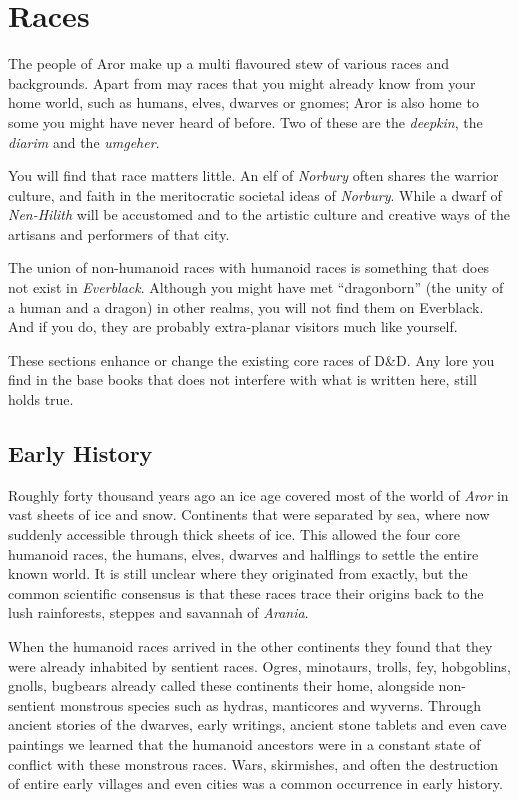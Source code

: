 \twocolumn
\section*{Races}

The people of Aror make up a multi flavoured stew of various races and
backgrounds. Apart from may races that you might already know from your
home world, such as humans, elves, dwarves or gnomes; Aror is also home to some
you might have never heard of before. Two of these are the \emph{deepkin}, the
\emph{diarim} and the \emph{umgeher}.

You will find that race matters little. An elf of \emph{Norbury} often shares
the warrior culture, and faith in the meritocratic societal ideas
of \emph{Norbury}. While a dwarf of \emph{Nen-Hilith} will be accustomed and
to the artistic culture and creative ways of the artisans and performers of
that city.

The union of non-humanoid races with humanoid races is something that does
not exist in \emph{Everblack}. Although you might have met ``dragonborn''
(the unity of a human and a dragon) in other realms, you will not find them
on Everblack. And if you do, they are probably extra-planar visitors much
like yourself.

\begin{note}
These sections enhance or change the existing core races of D\&D. Any lore you
find in the base books that does not interfere with what is written here, still
holds true.
\end{note}

\subsection*{Early History}

Roughly forty thousand years ago an ice age covered most of the world
of \emph{Aror} in vast sheets of ice and snow. Continents that were separated
by sea, where now suddenly accessible through thick sheets of ice. This
allowed the four core humanoid races, the humans, elves, dwarves and halflings
to settle the entire known world. It is still unclear where they originated
from exactly, but the common scientific consensus is that these races trace
their origins back to the lush rainforests, steppes and savannah
of \emph{Arania}.

When the humanoid races arrived in the other continents they found that they
were already inhabited by sentient races. Ogres, minotaurs, trolls, fey,
hobgoblins, gnolls, bugbears already called these continents their home,
alongside non-sentient monstrous species such as hydras, manticores and
wyverns. Through ancient stories of the dwarves, early writings, ancient stone
tablets and even cave paintings we learned that the humanoid ancestors were in
a constant state of conflict with these monstrous races. Wars, skirmishes, and
often the destruction of entire early villages and even cities was a common
occurrence in early history.

